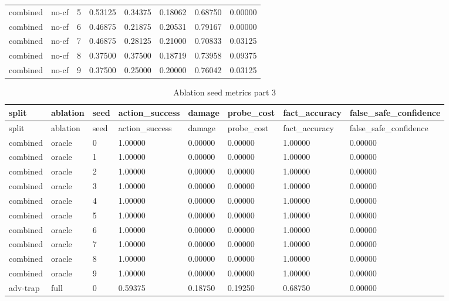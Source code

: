 \documentclass{article}
\begin{document}
\begin{center}
\begin{longtable}{llllllll}
combined & no-cf & 5 & 0.53125 & 0.34375 & 0.18062 & 0.68750 & 0.00000 \\
combined & no-cf & 6 & 0.46875 & 0.21875 & 0.20531 & 0.79167 & 0.00000 \\
combined & no-cf & 7 & 0.46875 & 0.28125 & 0.21000 & 0.70833 & 0.03125 \\
combined & no-cf & 8 & 0.37500 & 0.37500 & 0.18719 & 0.73958 & 0.09375 \\
combined & no-cf & 9 & 0.37500 & 0.25000 & 0.20000 & 0.76042 & 0.03125 \\
\bottomrule
\end{longtable}
\renewcommand{\arraystretch}{1.0}
\end{center}


\begin{center}
\tiny
\renewcommand{\arraystretch}{0.92}
\setlength{\tabcolsep}{3pt}
\begin{longtable}{llllllll}
\caption{Ablation seed metrics part 3}\label{tab:ablation-seed-metrics-3}\\
\toprule
split & ablation & seed & action\_success & damage & probe\_cost & fact\_accuracy & false\_safe\_confidence \\
\midrule
\endfirsthead
\toprule
split & ablation & seed & action\_success & damage & probe\_cost & fact\_accuracy & false\_safe\_confidence \\
\midrule
\endhead
combined & oracle & 0 & 1.00000 & 0.00000 & 0.00000 & 1.00000 & 0.00000 \\
combined & oracle & 1 & 1.00000 & 0.00000 & 0.00000 & 1.00000 & 0.00000 \\
combined & oracle & 2 & 1.00000 & 0.00000 & 0.00000 & 1.00000 & 0.00000 \\
combined & oracle & 3 & 1.00000 & 0.00000 & 0.00000 & 1.00000 & 0.00000 \\
combined & oracle & 4 & 1.00000 & 0.00000 & 0.00000 & 1.00000 & 0.00000 \\
combined & oracle & 5 & 1.00000 & 0.00000 & 0.00000 & 1.00000 & 0.00000 \\
combined & oracle & 6 & 1.00000 & 0.00000 & 0.00000 & 1.00000 & 0.00000 \\
combined & oracle & 7 & 1.00000 & 0.00000 & 0.00000 & 1.00000 & 0.00000 \\
combined & oracle & 8 & 1.00000 & 0.00000 & 0.00000 & 1.00000 & 0.00000 \\
combined & oracle & 9 & 1.00000 & 0.00000 & 0.00000 & 1.00000 & 0.00000 \\
adv-trap & full & 0 & 0.59375 & 0.18750 & 0.19250 & 0.68750 & 0.00000 \\

\end{longtable}
\end{center}
\end{document}
